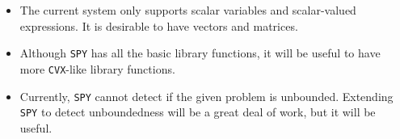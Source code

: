 \begin{itemize}
\item The current system only supports scalar variables and scalar-valued expressions. It is desirable to have vectors and matrices.
\item Although \verb'SPY' has all the basic library functions, it will be useful to have more \verb'CVX'-like library functions.
\item Currently, \verb'SPY' cannot detect if the given problem is unbounded. Extending \verb'SPY' to detect unboundedness will be a great deal of work, but it will be useful.
\end{itemize}
